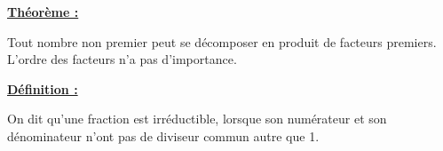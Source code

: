 \documentclass[12pt]{article}
\begin{document}
\vspace{10pt}
\begin{mdframed}[
    linewidth=1pt,
    roundcorner=5pt,
    linecolor=Red,
    innertopmargin=10pt,
    innerbottommargin=10pt
]
{\color{red}
\textbf{\underline{Théorème :}}

\vspace{5pt}
Tout nombre non premier peut se décomposer en produit de facteurs premiers.
\\L’ordre des facteurs n’a pas d’importance.
}
\end{mdframed}

\begin{mdframed}[
    linewidth=1pt,
    roundcorner=5pt,
    linecolor=ForestGreen,
    innertopmargin=10pt,
    innerbottommargin=10pt
]
{\color{ForestGreen}
\textbf{\underline{Définition :}}}

\vspace{5pt}
 On dit qu’une fraction est irréductible, lorsque son numérateur et son
dénominateur n’ont pas de diviseur commun autre que 1.

\end{mdframed}
\end{document}
